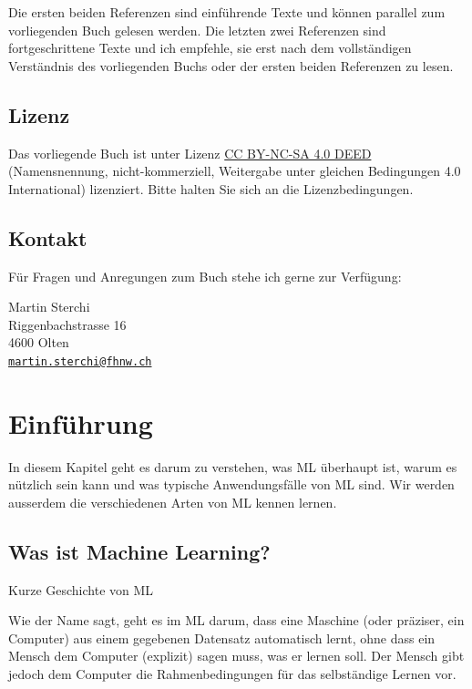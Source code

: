 \documentclass[
]{book}
\begin{document}
Die ersten beiden Referenzen sind einführende Texte und können parallel zum vorliegenden Buch gelesen werden. Die letzten zwei Referenzen sind fortgeschrittene Texte und ich empfehle, sie erst nach dem vollständigen Verständnis des vorliegenden Buchs oder der ersten beiden Referenzen zu lesen.

\hypertarget{lizenz}{%
\section*{Lizenz}\label{lizenz}}

Das vorliegende Buch ist unter Lizenz \href{https://creativecommons.org/licenses/by-nc-sa/4.0/deed.de}{CC BY-NC-SA 4.0 DEED} (Namensnennung, nicht-kommerziell, Weitergabe unter gleichen Bedingungen 4.0 International) lizenziert. Bitte halten Sie sich an die Lizenzbedingungen.

\hypertarget{kontakt}{%
\section*{Kontakt}\label{kontakt}}

Für Fragen und Anregungen zum Buch stehe ich gerne zur Verfügung:

Martin Sterchi\\
Riggenbachstrasse 16\\
4600 Olten\\
\href{mailto:martin.sterchi@fhnw.ch}{\nolinkurl{martin.sterchi@fhnw.ch}}

\hypertarget{intro}{%
\chapter{Einführung}\label{intro}}

In diesem Kapitel geht es darum zu verstehen, was ML überhaupt ist, warum es nützlich sein kann und was typische Anwendungsfälle von ML sind. Wir werden ausserdem die verschiedenen Arten von ML kennen lernen.

\hypertarget{was-ist-machine-learning}{%
\section{Was ist Machine Learning?}\label{was-ist-machine-learning}}

Kurze Geschichte von ML

Wie der Name sagt, geht es im ML darum, dass eine Maschine (oder präziser, ein Computer) aus einem gegebenen Datensatz automatisch lernt, ohne dass ein Mensch dem Computer (explizit) sagen muss, was er lernen soll. Der Mensch gibt jedoch dem Computer die Rahmenbedingungen für das selbständige Lernen vor.
\end{document}
